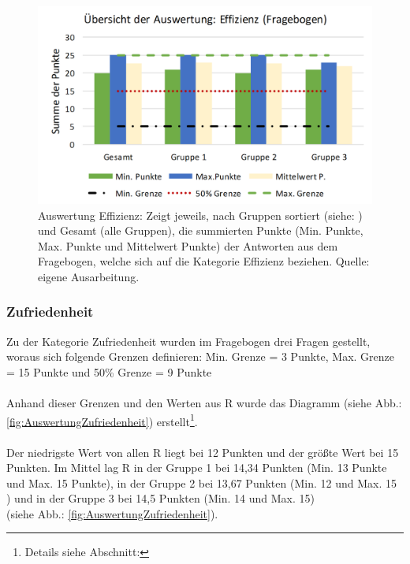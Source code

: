 \documentclass[Bachelorarbeit.tex]{subfiles}
\begin{document}
\begin{figure}[H]
\centering
\includegraphics[width=0.9\linewidth]{img/Evaluation/Usability/AuswertungEffizienz}
\caption[Übersicht der Effizienz]{Auswertung Effizienz: Zeigt jeweils, nach Gruppen sortiert (siehe: ) und Gesamt (alle Gruppen), die summierten Punkte (Min. Punkte, Max. Punkte und Mittelwert Punkte) der Antworten aus dem Fragebogen, welche sich auf die Kategorie Effizienz beziehen. Quelle: eigene Ausarbeitung.}
\label{fig:AuswertungEffizienz}
\end{figure}


\subsubsection{Zufriedenheit}
Zu der Kategorie Zufriedenheit wurden im Fragebogen drei Fragen gestellt, woraus sich folgende Grenzen definieren: Min. Grenze = 3 Punkte, Max. Grenze = 15 Punkte und 50\% Grenze = 9 Punkte\\
\\
Anhand dieser Grenzen und den Werten aus R wurde das Diagramm  (siehe Abb.: \ref{fig:AuswertungZufriedenheit}) erstellt\footnote{Details siehe Abschnitt: }.\\
\\
Der niedrigste Wert von allen R liegt bei 12 Punkten und der größte Wert bei 15 Punkten.
Im Mittel lag R in der Gruppe 1 bei 14,34 Punkten (Min. 13 Punkte und Max. 15 Punkte), in der Gruppe 2 bei 13,67 Punkten (Min. 12 und Max. 15 ) und in der Gruppe 3 bei 14,5 Punkten (Min. 14 und Max. 15)\\
(siehe Abb.: \ref{fig:AuswertungZufriedenheit}).
\end{document}
